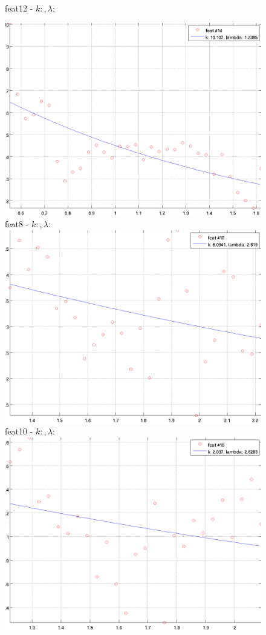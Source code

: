\documentclass[12pt]{report}
\begin{document}
\begin{figure}
\begin{minipage}[t]{0.3\linewidth}
	feat12 - $k: , \lambda:  $\\
\end{minipage}
\begin{minipage}[t]{0.3\linewidth}
	\centering
	\includegraphics[scale=\imFeatScale]{images/feat14}
	feat8 - $k: , \lambda:  $\\
	\includegraphics[scale=\imFeatScale]{images/feat16}
	feat10 - $k: , \lambda:  $\\
	\includegraphics[scale=\imFeatScale]{images/feat18}

\end{minipage}
\end{figure}
\end{document}
